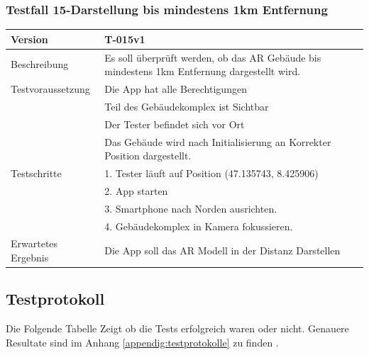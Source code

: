 \documentclass[a4paper]{scrreprt}
\begin{document}
\subsubsection{Testfall 15-Darstellung bis mindestens 1km Entfernung}
\begin{tabularx}{\textwidth}{|l|X|}
\hline 
	Version &
	T-015v1 \\ 
\hline 
	Beschreibung & 
	Es soll überprüft werden, ob das AR Gebäude bis mindestens 1km Entfernung dargestellt wird. \\ 
\hline 
	Testvoraussetzung &
	Die App hat alle Berechtigungen \\ &
	Teil des Gebäudekomplex ist Sichtbar \\ &
	Der Tester befindet sich vor Ort \\ &
	Das Gebäude wird nach Initialisierung an Korrekter Position dargestellt. \\
\hline 
	Testschritte & 
		1. Tester läuft auf Position (47.135743, 8.425906) \\ &
		2. App starten \\ &
		3. Smartphone nach Norden ausrichten. \\ &
		4. Gebäudekomplex in Kamera fokussieren. \\ 
\hline
	Erwartetes Ergebnis &
	Die App soll das AR Modell in der Distanz Darstellen \\ 
\hline 
\end{tabularx}
\subsection{Testprotokoll}
\label{ch:testprotokoll}
Die Folgende Tabelle Zeigt ob die Tests erfolgreich waren oder nicht. Genauere Resultate sind im Anhang \ref{appendig:testprotokolle} zu finden . 
\bigbreak
\end{document}
